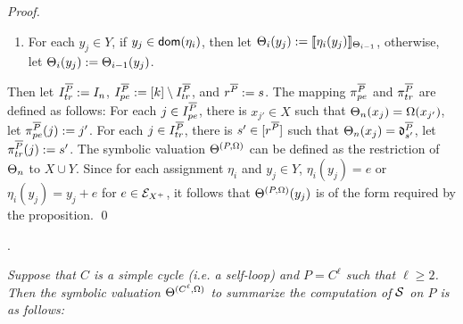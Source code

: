 \begin{appendix}
\begin{proof}
\begin{itemize}
\begin{enumerate}
\item For each $y_j \in Y$, if $y_j \in \mathsf{dom}(\eta_i)$, then let $\Theta_i(y_j) := \llbracket\eta_i(y_j)\rrbracket_{\Theta_{i-1}}$, otherwise, let $\Theta_i(y_j) :=\Theta_{i-1}(y_j)$.
\end{enumerate}
%
%
\end{itemize} 
Then let $I^{\overline{P}}_{tr}:=I_n$, $I^{\overline{P}}_{pe}:=[k] \setminus I^{\overline{P}}_{tr}$, and $r^{\overline{P}}:=s$. The mapping $\pi^{\overline{P}}_{pe}$ and $\pi^{\overline{P}}_{tr}$ are defined as follows: For each $j \in I^{\overline{P}}_{pe}$, there is $x_{j'} \in X$ such that $\Theta_n(x_j) = \Omega(x_{j'})$, let $\pi^{\overline{P}}_{pe}(j) := j'$. For each $j \in I^{\overline{P}}_{tr}$, there is $s' \in [r^{\overline{P}}]$ such that $\Theta_n(x_j)=\mathfrak{d}^{\overline{P}}_{s'}$, let $\pi^{\overline{P}}_{tr}(j):=s'$. The symbolic valuation $\Theta^{(P,\Omega)}$ can be defined as the restriction of $\Theta_n$ to $X \cup Y$. Since for each assignment $\eta_i$ and $y_j \in Y$, $\eta_i(y_j) = e$ or $\eta_i(y_j) = y_j +e$ for $e \in {\mathcal{E} }_{X^+}$, it follows that $\Theta^{(P,\Omega)}(y_j)$ is of the form required by the proposition.
\qed
\end{proof}


.
{\it 
Suppose that $C$ is a simple cycle (i.e. a self-loop) and $P=C^{\ell}$ such that $\ell \ge 2$. Then the symbolic valuation $\Theta^{(C^\ell,\Omega)}$ to summarize the computation of ${\mathcal{S} }$ on $P$ is as follows:  

}
\end{appendix}
